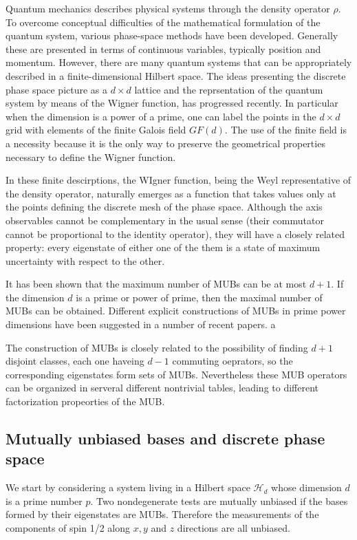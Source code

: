 \documentclass[a4paper]{article}
\begin{document}
  Quantum mechanics describes physical systems through the
  density operator $\rho$. To overcome conceptual
  difficulties of the mathematical formulation of the
  quantum system, various phase-space methods have been
  developed. Generally these are presented in terms of
  continuous variables, typically position and momentum.
  However, there are many quantum systems that can be
  appropriately described in a finite-dimensional Hilbert
  space. The ideas presenting the discrete phase space
  picture as a $d \times d$ lattice and the reprsentation of
  the quantum system by means of the Wigner function, has
  progressed recently.  In particular when the dimension is
  a power of a prime, one can label the points in the $d
  \times d$ grid with elements of the finite Galois field
  $GF(d)$. The use of the finite field is a necessity
  because it is the only way to preserve the geometrical
  properties necessary to define the Wigner function.

  In these finite descirptions, the WIgner function, being
  the Weyl representative of the density operator, naturally
  emerges as a function that takes values only at the points
  defining the discrete mesh of the phase space. Although
  the axis observables cannot be complementary in the usual
  sense (their commutator cannot be proportional to the
  identity operator), they will have a closely related
  property: every eigenstate of either one of the them is a
  state of maximum uncertainty with respect to the other.

  It has been shown that the maximum number of MUBs can be
  at most $d+1$. If the dimension $d$ is a prime or power of
  prime, then the maximal number of MUBs can be obtained.
  Different explicit constructions of MUBs in prime power
  dimensions have been suggested in a number of recent
  papers. a

  The construction of MUBs is closely related to the
  possibility of finding $d+1$ disjoint classes, each one
  haveing $d-1$ commuting oeprators, so the corresponding
  eigenstates form sets of MUBs. Nevertheless these MUB
  operators can be organized in serveral different
  nontrivial tables, leading to different factorization
  propeorties of the MUB.

  \subsection{Mutually unbiased bases and discrete phase
  space}

  We start by considering a system living in a Hilbert space
  $\mathcal{H}_d$ whose dimension $d$ is a prime number $p$.
  Two nondegenerate tests are mutually unbiased if the bases
  formed by their eigenstates are MUBs. Therefore the
  measurements of the components of spin 1/2 along $x,y$ and
  $z$ directions are all unbiased.
\end{document}
